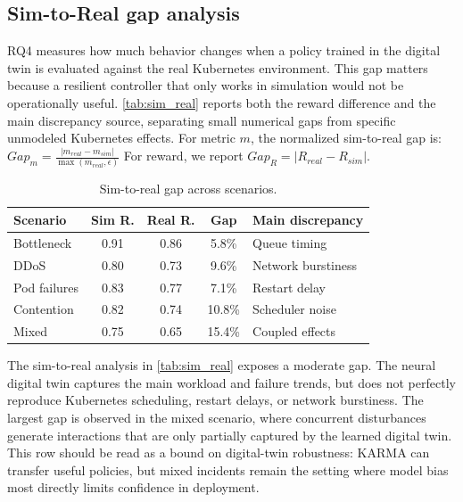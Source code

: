 \documentclass[journal]{IEEEtran}
\begin{document}
\subsection{Sim-to-Real gap analysis}
\label{sec:sim_to_real}

RQ4 measures how much behavior changes when a policy trained in the digital twin is evaluated against the real Kubernetes environment. This gap matters because a resilient controller that only works in simulation would not be operationally useful. \autoref{tab:sim_real} reports both the reward difference and the main discrepancy source, separating small numerical gaps from specific unmodeled Kubernetes effects.
%
For metric $m$, the normalized sim-to-real gap is:
$Gap_m=\frac{|m_{real}-m_{sim}|}{\max(m_{real},\epsilon)}$
For reward, we report $Gap_R=|R_{real}-R_{sim}|$.

\begin{table}[t]
  \centering
  \caption{Sim-to-real gap across scenarios.}
  \label{tab:sim_real}
  \scriptsize
  \setlength{\tabcolsep}{3pt}
  \begin{tabularx}{\columnwidth}{lcccX}
    \toprule
    \textbf{Scenario} & \textbf{Sim R.} & \textbf{Real R.} & \textbf{Gap} & \textbf{Main discrepancy} \\
    \midrule
    Bottleneck        & 0.91            & 0.86             & 5.8\%        & Queue timing              \\
    DDoS              & 0.80            & 0.73             & 9.6\%        & Network burstiness        \\
    Pod failures      & 0.83            & 0.77             & 7.1\%        & Restart delay             \\
    Contention        & 0.82            & 0.74             & 10.8\%       & Scheduler noise           \\
    Mixed             & 0.75            & 0.65             & 15.4\%       & Coupled effects           \\
    \bottomrule
  \end{tabularx}
\end{table}

The sim-to-real analysis in \autoref{tab:sim_real} exposes a moderate gap. The neural digital twin captures the main workload and failure trends, but does not perfectly reproduce Kubernetes scheduling, restart delays, or network burstiness. The largest gap is observed in the mixed scenario, where concurrent disturbances generate interactions that are only partially captured by the learned digital twin. This row should be read as a bound on digital-twin robustness: KARMA can transfer useful policies, but mixed incidents remain the setting where model bias most directly limits confidence in deployment.
\end{document}
